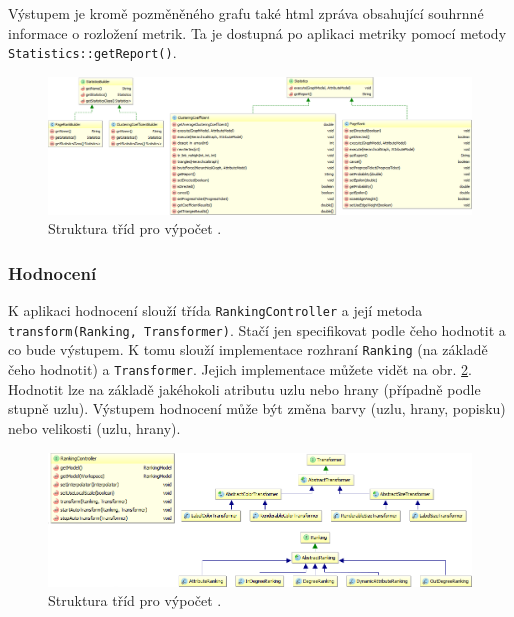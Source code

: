 \documentclass[thesis=M,czech]{FITthesis}[2014/05/6]
\begin{document}
Výstupem  je kromě pozměněného grafu také html zpráva obsahující souhrnné informace o rozložení metrik. Ta je dostupná po
aplikaci metriky pomocí metody \texttt{Statistics::getReport()}.

\begin{figure}\centering
 	\includegraphics[width=1\textwidth]{images/class-diagram/statistics}
 	\caption[Struktura tříd pro výpočet ]{Struktura tříd pro výpočet .}\label{fig:uml-statistics}
\end{figure}



\subsubsection{Hodnocení}
K aplikaci hodnocení slouží třída \texttt{RankingController} a její metoda \texttt{transform(Ranking, Transformer)}. Stačí jen specifikovat podle čeho hodnotit
a co bude výstupem. K tomu slouží implementace rozhraní \texttt{Ranking} (na základě čeho hodnotit) a \texttt{Transformer}. Jejich implementace můžete vidět na 
obr. \ref{fig:uml-ranking}. Hodnotit lze na základě jakéhokoli atributu uzlu nebo hrany (případně podle stupně uzlu). Výstupem hodnocení může být změna barvy (uzlu, hrany, popisku) 
nebo velikosti (uzlu, hrany).

\begin{figure}\centering
 	\includegraphics[width=1\textwidth]{images/class-diagram/ranking}
 	\caption[Struktura tříd pro výpočet ]{Struktura tříd pro výpočet .}\label{fig:uml-ranking}
\end{figure}
\end{document}
